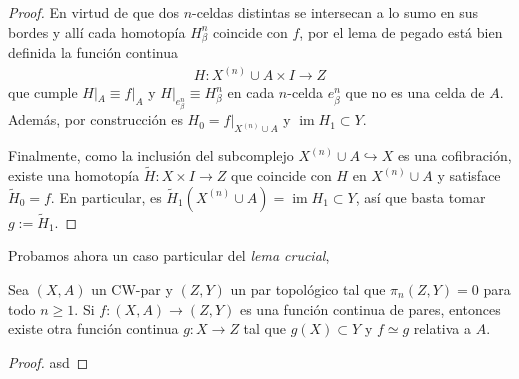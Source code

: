 \documentclass[11pt]{article}
\newcommand{\im}{\operatorname{im}}
\newcommand{\paint}[1]{\color{color}{#1}}
\newenvironment{lemma}[2][Lema]{\begin{trivlist}
\item[\hskip \labelsep \paint{{\bfseries #1}}\hskip \labelsep {\bfseries #2.}]}{\end{trivlist}}
\begin{document}
\begin{proof}
En virtud de que dos $n$-celdas distintas se intersecan a lo sumo en sus bordes y allí cada homotopía $H_\beta^n$ coincide con $f$, por el lema de pegado está bien definida la función continua
\begin{align*}
H : X^{(n)} \cup A \times I \to Z
\end{align*}
que cumple $H|_A \equiv f|_A$ y $H|_{e_\beta^n} \equiv H_\beta^n$ en cada $n$-celda $e_\beta^n$ que no es una celda de $A$. Además, por construcción es $H_0 = f|_{X^{(n)} \cup A}$ y $\im H_1 \subset Y$.

Finalmente, como la inclusión del subcomplejo $X^{(n)} \cup A \hookrightarrow X$ es una cofibración, existe una homotopía $\tilde{H} : X \times I \to Z$ que coincide con $H$ en $X^{(n)} \cup A$ y satisface $\tilde{H}_0 = f$. En particular, es $\tilde{H}_1(X^{(n)}\cup A) = \im H_1 \subset Y$, así que basta tomar $g := \tilde{H}_1$.
\end{proof}

Probamos ahora un caso particular del \textit{lema crucial},

\begin{lemma}{2} Sea $(X,A)$ un CW-par y $(Z,Y)$ un par topológico tal que $\pi_n(Z,Y) = 0$ para todo $n \geq 1$. Si $f : (X,A) \to (Z,Y)$ es una función continua de pares, entonces existe otra función continua $g : X \to Z$ tal que $g(X) \subset Y$ y $f \simeq g$ relativa a $A$.
\end{lemma}
\begin{proof} asd
\end{proof}
\end{document}
